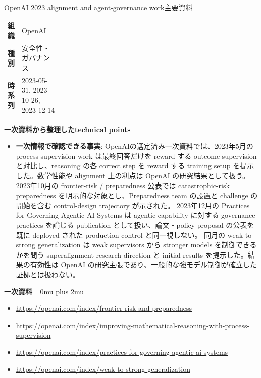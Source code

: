 \begin{technicalnote}{OpenAI 2023 alignment and agent-governance work}{主要資料}
\begingroup
\begin{tabularx}{\linewidth}{@{}>{\bfseries}p{0.22\linewidth}X@{}}
組織 & OpenAI \\
種別 & 安全性・ガバナンス \\
時系列 & 2023-05-31, 2023-10-26, 2023-12-14 \\
\end{tabularx}
\smallskip
{\bfseries 一次資料から整理したtechnical points}
\begin{itemize}[leftmargin=1.5em,itemsep=0.35em]
\item \textbf{一次情報で確認できる事実}: OpenAIの選定済み一次資料では、2023年5月の process-supervision work は最終回答だけを reward する outcome supervision と対比し、reasoning の各 correct step を reward する training setup を提示した。数学性能や alignment 上の利点は OpenAI の研究結果として扱う。 2023年10月の frontier-risk / preparedness 公表では catastrophic-risk preparedness を明示的な対象とし、Preparedness team の設置と challenge の開始を含む control-design trajectory が示された。 2023年12月の Practices for Governing Agentic AI Systems は agentic capability に対する governance practices を論じる publication として扱い、論文・policy proposal の公表を既に deployed された production control と同一視しない。 同月の weak-to-strong generalization は weak supervisors から stronger models を制御できるかを問う superalignment research direction と initial results を提示した。結果の有効性は OpenAI の研究主張であり、一般的な強モデル制御が確立した証拠とは扱わない。
\end{itemize}
\begin{minipage}{\linewidth}
\begin{samepage}
{\bfseries 一次資料}
\begingroup\sloppy
\Urlmuskip=0mu plus 2mu\relax
\begin{itemize}[leftmargin=1.5em,itemsep=0.25em]
\item {\scriptsize\url{https://openai.com/index/frontier-risk-and-preparedness}}
\item {\scriptsize\url{https://openai.com/index/improving-mathematical-reasoning-with-process-supervision}}
\item {\scriptsize\url{https://openai.com/index/practices-for-governing-agentic-ai-systems}}
\item {\scriptsize\url{https://openai.com/index/weak-to-strong-generalization}}
\end{itemize}
\endgroup
\end{samepage}
\end{minipage}
\endgroup
\end{technicalnote}
\medskip

